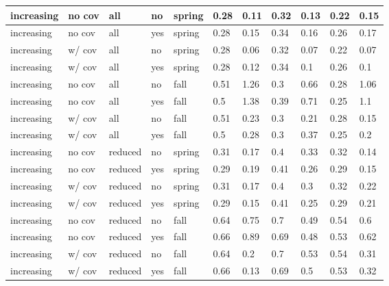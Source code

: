 \documentclass[
]{article}
\begin{document}
\begin{table}
\begin{tabular}[t]{l|l|l|l|l|l|l|l|l|l|l}
\hline
increasing & no cov & all & no & spring & 0.28 & 0.11 & 0.32 & 0.13 & 0.22 & 0.15\\
\hline
increasing & no cov & all & yes & spring & 0.28 & 0.15 & 0.34 & 0.16 & 0.26 & 0.17\\
\hline
increasing & w/ cov & all & no & spring & 0.28 & 0.06 & 0.32 & 0.07 & 0.22 & 0.07\\
\hline
increasing & w/ cov & all & yes & spring & 0.28 & 0.12 & 0.34 & 0.1 & 0.26 & 0.1\\
\hline
increasing & no cov & all & no & fall & 0.51 & 1.26 & 0.3 & 0.66 & 0.28 & 1.06\\
\hline
increasing & no cov & all & yes & fall & 0.5 & 1.38 & 0.39 & 0.71 & 0.25 & 1.1\\
\hline
increasing & w/ cov & all & no & fall & 0.51 & 0.23 & 0.3 & 0.21 & 0.28 & 0.15\\
\hline
increasing & w/ cov & all & yes & fall & 0.5 & 0.28 & 0.3 & 0.37 & 0.25 & 0.2\\
\hline
increasing & no cov & reduced & no & spring & 0.31 & 0.17 & 0.4 & 0.33 & 0.32 & 0.14\\
\hline
increasing & no cov & reduced & yes & spring & 0.29 & 0.19 & 0.41 & 0.26 & 0.29 & 0.15\\
\hline
increasing & w/ cov & reduced & no & spring & 0.31 & 0.17 & 0.4 & 0.3 & 0.32 & 0.22\\
\hline
increasing & w/ cov & reduced & yes & spring & 0.29 & 0.15 & 0.41 & 0.25 & 0.29 & 0.21\\
\hline
increasing & no cov & reduced & no & fall & 0.64 & 0.75 & 0.7 & 0.49 & 0.54 & 0.6\\
\hline
increasing & no cov & reduced & yes & fall & 0.66 & 0.89 & 0.69 & 0.48 & 0.53 & 0.62\\
\hline
increasing & w/ cov & reduced & no & fall & 0.64 & 0.2 & 0.7 & 0.53 & 0.54 & 0.31\\
\hline
increasing & w/ cov & reduced & yes & fall & 0.66 & 0.13 & 0.69 & 0.5 & 0.53 & 0.32\\
\hline
\end{tabular}
\end{table}
\end{document}

